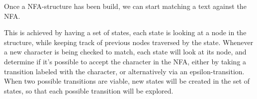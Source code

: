 %





Once a NFA-structure has been build, we can start matching a text against the NFA.

This is achieved by having a set of states, each state is looking at a node in the structure, while keeping track of previous nodes traversed by the state. Whenever a new character is being checked to match, each state will look at its node, and determine if it's possible to accept the character in the NFA, either by taking a transition labeled with the character, or alternatively via an epsilon-transition. When two possible transitions are viable, new states will be created in the set of states, so that each possible transition will be explored.

